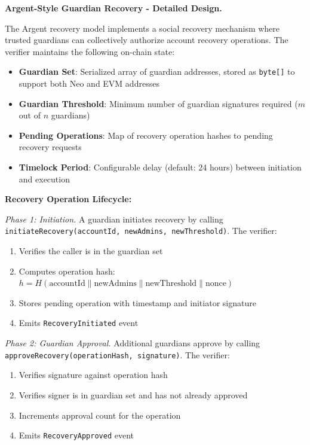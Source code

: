 \documentclass[10pt,twocolumn]{article}
\newcommand{\code}[1]{\texttt{\small #1}}
\begin{document}
\textbf{Argent-Style Guardian Recovery - Detailed Design.}

The Argent recovery model implements a social recovery mechanism where trusted guardians can collectively authorize account recovery operations. The verifier maintains the following on-chain state:

\begin{itemize}[leftmargin=*,topsep=2pt,itemsep=1pt]
\item \textbf{Guardian Set}: Serialized array of guardian addresses, stored as \code{byte[]} to support both Neo and EVM addresses
\item \textbf{Guardian Threshold}: Minimum number of guardian signatures required ($m$ out of $n$ guardians)
\item \textbf{Pending Operations}: Map of recovery operation hashes to pending recovery requests
\item \textbf{Timelock Period}: Configurable delay (default: 24 hours) between initiation and execution
\end{itemize}

\textbf{Recovery Operation Lifecycle:}

\textit{Phase 1: Initiation.} A guardian initiates recovery by calling \code{initiateRecovery(accountId, newAdmins, newThreshold)}. The verifier:
\begin{enumerate}[leftmargin=*,topsep=2pt,itemsep=1pt]
\item Verifies the caller is in the guardian set
\item Computes operation hash: $h = H(\text{accountId} \| \text{newAdmins} \| \text{newThreshold} \| \text{nonce})$
\item Stores pending operation with timestamp and initiator signature
\item Emits \code{RecoveryInitiated} event
\end{enumerate}

\textit{Phase 2: Guardian Approval.} Additional guardians approve by calling \code{approveRecovery(operationHash, signature)}. The verifier:
\begin{enumerate}[leftmargin=*,topsep=2pt,itemsep=1pt]
\item Verifies signature against operation hash
\item Verifies signer is in guardian set and has not already approved
\item Increments approval count for the operation
\item Emits \code{RecoveryApproved} event
\end{enumerate}
\end{document}
